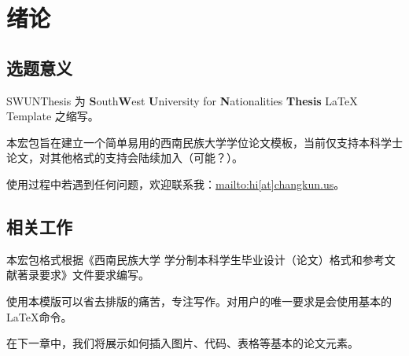 \chapter{绪论}
\section{选题意义}
SWUNThesis 为 \textbf{S}outh\textbf{W}est \textbf{U}niversity for \textbf{N}ationalities \textbf{Thesis} LaTeX Template 之缩写。

本宏包旨在建立一个简单易用的西南民族大学学位论文模板，当前仅支持本科学士论文，对其他格式的支持会陆续加入（可能？）。

使用过程中若遇到任何问题，欢迎联系我：\url{mailto:hi[at]changkun.us}。

\section{相关工作}

本宏包格式根据《西南民族大学
学分制本科学生毕业设计（论文）格式和参考文献著录要求》文件要求编写。

使用本模版可以省去排版的痛苦，专注写作。对用户的唯一要求是会使用基本的 \LaTeX 命令。

在下一章中，我们将展示如何插入图片、代码、表格等基本的论文元素。
